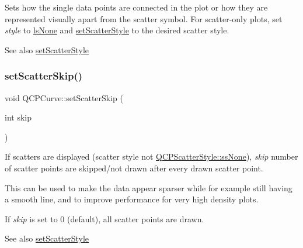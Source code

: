 Sets how the single data points are connected in the plot or how they are represented visually apart from the scatter symbol. For scatter-\/only plots, set {\itshape style} to \hyperlink{class_q_c_p_curve_a2710e9f79302152cff794c6e16cc01f1aec1601a191cdf0b4e761c4c66092cc48}{ls\+None} and \hyperlink{class_q_c_p_curve_a55e43b44709bf50a35500644988aa706}{set\+Scatter\+Style} to the desired scatter style.

\begin{DoxySeeAlso}{See also}
\hyperlink{class_q_c_p_curve_a55e43b44709bf50a35500644988aa706}{set\+Scatter\+Style} 
\end{DoxySeeAlso}
\mbox{\label{class_q_c_p_curve_a97dbfecd497e972d5f2162615e6da5be}} 
\subsubsection{\texorpdfstring{set\+Scatter\+Skip()}{setScatterSkip()}}
{\footnotesize\ttfamily void Q\+C\+P\+Curve\+::set\+Scatter\+Skip (\begin{DoxyParamCaption}\item[{int}]{skip }\end{DoxyParamCaption})}

If scatters are displayed (scatter style not \hyperlink{class_q_c_p_scatter_style_adb31525af6b680e6f1b7472e43859349abd144c291ca274f77053ec68cab6c022}{Q\+C\+P\+Scatter\+Style\+::ss\+None}), {\itshape skip} number of scatter points are skipped/not drawn after every drawn scatter point.

This can be used to make the data appear sparser while for example still having a smooth line, and to improve performance for very high density plots.

If {\itshape skip} is set to 0 (default), all scatter points are drawn.

\begin{DoxySeeAlso}{See also}
\hyperlink{class_q_c_p_curve_a55e43b44709bf50a35500644988aa706}{set\+Scatter\+Style} 
\end{DoxySeeAlso}
\mbox{\label{class_q_c_p_curve_a55e43b44709bf50a35500644988aa706}} 
